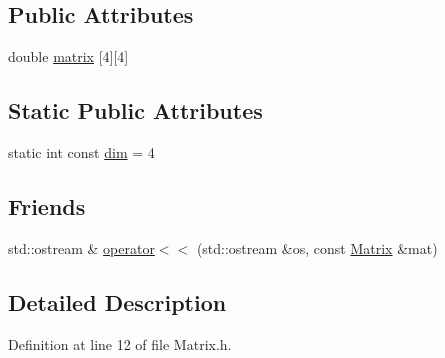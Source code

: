 \subsection*{Public Attributes}
\begin{DoxyCompactItemize}
\item 
double \hyperlink{class_matrix_a7262fb79344386da3983a61a0074f754}{matrix} \mbox{[}4\mbox{]}\mbox{[}4\mbox{]}
\end{DoxyCompactItemize}
\subsection*{Static Public Attributes}
\begin{DoxyCompactItemize}
\item 
static int const \hyperlink{class_matrix_a44f940fc5a7552347943f5e3c9c96b8f}{dim} = 4
\end{DoxyCompactItemize}
\subsection*{Friends}
\begin{DoxyCompactItemize}
\item 
std::ostream \& \hyperlink{class_matrix_a6c0087f550d6b94e3b9d6d7bf0e846a6}{operator$<$$<$} (std::ostream \&os, const \hyperlink{class_matrix}{Matrix} \&mat)
\end{DoxyCompactItemize}


\subsection{Detailed Description}


Definition at line 12 of file Matrix.h.



